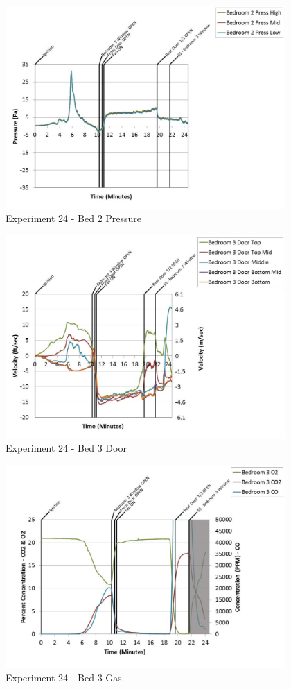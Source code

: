 \documentclass{article}
\begin{document}
\begin{appendices}
	\clearpage

	\begin{figure}[h!]
		\centering
		\includegraphics[height=3.05in]{0_Images/Results_Charts/Exp_24_Charts/Bed2Pressure.pdf}
		\caption{Experiment 24 - Bed 2 Pressure}
	\end{figure}
 

	\begin{figure}[h!]
		\centering
		\includegraphics[height=3.05in]{0_Images/Results_Charts/Exp_24_Charts/Bed3Door.pdf}
		\caption{Experiment 24 - Bed 3 Door}
	\end{figure}
 
	\clearpage

	\begin{figure}[h!]
		\centering
		\includegraphics[height=3.05in]{0_Images/Results_Charts/Exp_24_Charts/Bed3Gas.pdf}
		\caption{Experiment 24 - Bed 3 Gas}
	\end{figure}
 


\end{appendices}
\end{document}
